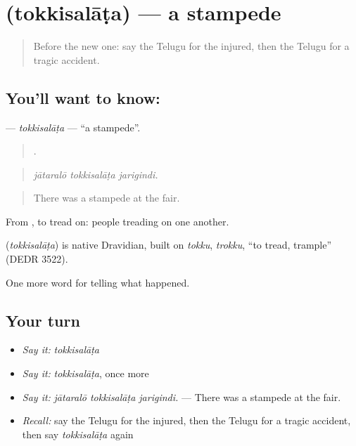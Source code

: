 \section[\texorpdfstring{\te{తొక్కిసలాట} (tokkisalāṭa)}{తొక్కిసలాట (tokkisalāṭa)}]{ (tokkisalāṭa) — a stampede}

\label{lesson:TE-C343-tokkisalata}



\begin{quote}
Before the new one: say the Telugu for the injured, then the Telugu for a tragic accident.
\end{quote}

\subsection*{You'll want to know: }
\textbf{} — \emph{tokkisalāṭa} — \textquotedblleft{}a stampede\textquotedblright{}.

\begin{quote}
  .
\end{quote}

\begin{quote}
\emph{jātaralō tokkisalāṭa jarigindi.}
\end{quote}

\begin{quote}
There was a stampede at the fair.
\end{quote}

From , to tread on: people treading on one another.

\begin{cousinweb}
\textbf{} (\emph{tokkisalāṭa}) is native Dravidian, built on \emph{tokku}, \emph{trokku}, \textquotedblleft{}to tread, trample\textquotedblright{} (DEDR 3522).
\end{cousinweb}

\begin{grammarlens}[title={What you've built}]
One more word for telling what happened.
\end{grammarlens}

\subsection*{Your turn}
\begin{itemize}
\raggedright
  \item \emph{Say it:} \emph{tokkisalāṭa}
  \item \emph{Say it:} \emph{tokkisalāṭa}, once more
  \item \emph{Say it:} \emph{jātaralō tokkisalāṭa jarigindi.} — There was a stampede at the fair.
  \item \emph{Recall:} say the Telugu for the injured, then the Telugu for a tragic accident, then say \emph{tokkisalāṭa} again
\end{itemize}

